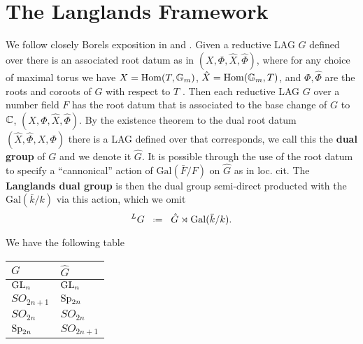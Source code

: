 \section{The Langlands Framework}
We follow closely Borels exposition in \cite[Part 2. III. 2. ]{borelAutomorphicFormsRepresentations1979} and \cite{shahidiEisensteinSeriesAutomorphic2010}.
Given a reductive LAG \(G\) defined over \C there is an associated root datum as in \((X, \Phi, \hat{X}, \hat{\Phi})\), where for any choice of maximal torus we have \(X = \operatorname{Hom}(T, \mathbb{G}_m)\), \(\hat{X} = \operatorname{Hom}(\mathbb{G}_m, T)\), and \(\Phi, \hat\Phi\) are the roots and coroots of \(G\) with respect to \(T\) \cite[7.4.3]{springerLinearAlgebraicGroups1998}.  Then each reductive LAG \(G\) over a number field \(F\) has the root datum that is associated to the base change of \(G\) to \(\C\), \((X, \Phi, \hat{X}, \hat{\Phi})\).
By the existence theorem \cite[10]{springerLinearAlgebraicGroups1998} to the dual root datum \(( \hat{X}, \hat{\Phi}, X, \Phi)\) there is a LAG defined over \C that corresponds, we call this the \textbf{dual group} of \(G\) and we denote it \(\hat{G}\). It is possible through the use of the root datum to specify a ``cannonical'' action of \(\mathrm{Gal}(\bar{F}/F)\) on \(\hat{G}\) as in loc. cit.
The \textbf{Langlands dual group} is then the dual group semi-direct producted with the \(\mathrm{Gal}(\bar{k}/k)\) via this action, which we omit
\[^L G \defeq \hat{G} \rtimes \mathrm{Gal}(\bar{k}/k).\]

\begin{example}
	We have the following table
	\begin{table}[h]
		\centering
		\begin{tabular}{ll}
			\(G\)         & \(\hat{G}\)   \\ \hline
			\(\operatorname{GL}_n\)     & \(\operatorname{GL}_n\)     \\
			\(SO_{2n+1}\) & \(\operatorname{Sp}_{2n}\)  \\
			\(SO_{2n}\)   & \(SO_{2n}\)   \\
			\(\operatorname{Sp}_{2n}\)  & \(SO_{2n+1}\)
		\end{tabular}
	\end{table}
\end{example}

